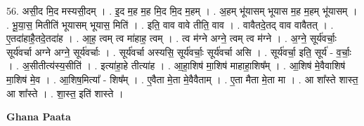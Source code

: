 \documentclass[17pt]{extarticle}
\begin{document}
56. असी॒द मि॒द मस्यसी॒दम् । . इ॒द म॒ह म॒ह मि॒द मि॒द म॒हम् । . अ॒हम् भू॑यासम् भूयास म॒ह म॒हम् भू॑यासम् । . भू॒या॒स॒ मितीति॑ भूयासम् भूयास॒ मिति॑ । . इति॒ वाव वावे तीति॒ वाव । . वावैतदे॒तद् वाव वावैतत् । . ए॒तदा॑हाहै॒तदे॒तदा॑ह । . आ॒ह॒ त्वम् त्व मा॑हाह॒ त्वम् । . त्व म॑ग्ने अग्ने॒ त्वम् त्व म॑ग्ने । . अ॒ग्ने॒ सूर्य॑वर्चाः॒ सूर्य॑वर्चा अग्ने अग्ने॒ सूर्य॑वर्चाः । . सूर्य॑वर्चा अस्यसि॒ सूर्य॑वर्चाः॒ सूर्य॑वर्चा असि । . सूर्य॑वर्चा॒ इति॒ सूर्य॑ - व॒र्चाः॒ । . अ॒सीतीत्य॑स्य॒सीति॑ । . इत्या॑हा॒हे तीत्या॑ह । . आ॒हा॒शिष॑ मा॒शिष॑ माहाहा॒शिष᳚म् । . आ॒शिष॑ मे॒वैवाशिष॑ मा॒शिष॑ मे॒व । . आ॒शिष॒मित्या᳚ - शिष᳚म् । . ए॒वैता मे॒ता मे॒वैवैताम् । . ए॒ता मैता मे॒ता मा । . आ शा᳚स्ते शास्त॒ आ शा᳚स्ते । . शा॒स्त॒ इति॑ शास्ते । \newline

\textbf{Ghana Paata } \newline
\end{document}
